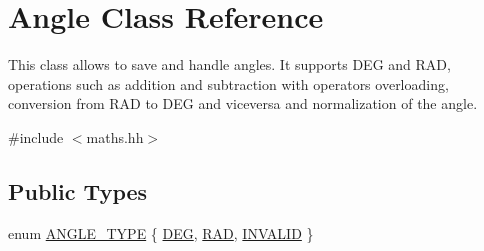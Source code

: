 \hypertarget{class_angle}{}\section{Angle Class Reference}
\label{class_angle}


This class allows to save and handle angles. It supports D\+EG and R\+AD, operations such as addition and subtraction with operators overloading, conversion from R\+AD to D\+EG and viceversa and normalization of the angle.  




{\ttfamily \#include $<$maths.\+hh$>$}

\subsection*{Public Types}
\begin{DoxyCompactItemize}
\item 
enum \mbox{\hyperlink{class_angle_a4f7b9849ce8780bcba95ca3ee45cff77}{A\+N\+G\+L\+E\+\_\+\+T\+Y\+PE}} \{ \mbox{\hyperlink{class_angle_a4f7b9849ce8780bcba95ca3ee45cff77a65e2aa4bc05730c9c2e8fdaf73612282}{D\+EG}}, 
\mbox{\hyperlink{class_angle_a4f7b9849ce8780bcba95ca3ee45cff77a93ab6b68075fd7a6fe724fbde5b13c1f}{R\+AD}}, 
\mbox{\hyperlink{class_angle_a4f7b9849ce8780bcba95ca3ee45cff77aa3c85e092f5da4bb998d0ddc6632dcbf}{I\+N\+V\+A\+L\+ID}}
 \}
\end{DoxyCompactItemize}
